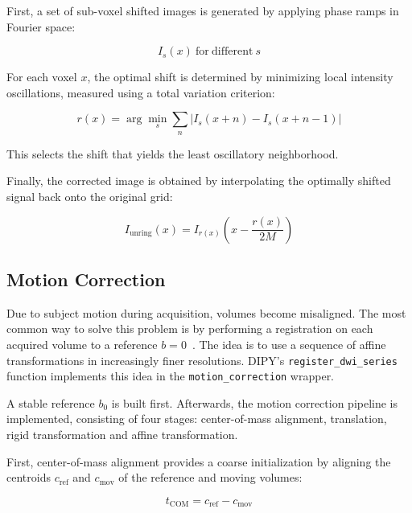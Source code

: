 First, a set of sub-voxel shifted images is generated by applying phase ramps in Fourier space:

\begin{equation}
	I_s(x)~\mathrm{for~different}~s
\end{equation}

For each voxel \(x\), the optimal shift is determined by minimizing local intensity oscillations, measured using a total variation criterion:

\begin{equation}
	r(x) = \arg\min_s \sum_n \left| I_s(x+n) - I_s(x+n-1) \right|
\end{equation}

This selects the shift that yields the least oscillatory neighborhood.

Finally, the corrected image is obtained by interpolating the optimally shifted signal back onto the original grid:

\begin{equation}
	I_{\text{unring}}(x) = I_{r(x)}\!\left(x - \frac{r(x)}{2M}\right)
\end{equation}

\subsection{Motion Correction}
\label{subsec:methods_motioncorrection}

Due to subject motion during acquisition, volumes become misaligned. The most common way to solve this problem is by performing a registration on each acquired volume to a reference $b=0$~\cite{jenkinson2001global}. The idea is to use a sequence of affine transformations in increasingly finer resolutions. DIPY's \texttt{register\_dwi\_series} function implements this idea in the \texttt{motion\_correction} wrapper.

A stable reference $b_0$ is built first. Afterwards, the motion correction pipeline is implemented, consisting of four stages: center-of-mass alignment, translation, rigid transformation and affine transformation.

First, center-of-mass alignment provides a coarse initialization by aligning the centroids $c_{\text{ref}}$ and $c_{\text{mov}}$ of the reference and moving volumes:

\begin{equation}
	t_{\text{COM}} = c_{\text{ref}} - c_{\text{mov}}
\end{equation}
\label{eq:motioncorrection_com}

